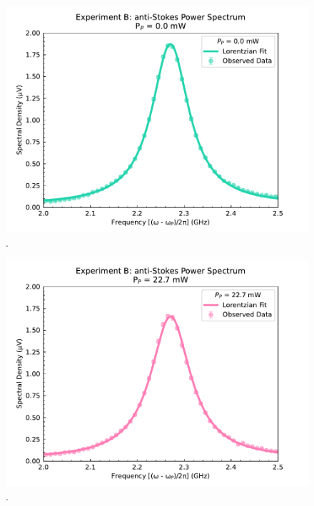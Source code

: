 \begin{figure}[t!]
  \centering
  \includegraphics[width=\textwidth]{figs/3-Cooling/P-P anti-Stokes Fit - 0mW.pdf}
  \caption{.}
  \label{fig:Cooling:P-P anti-Stokes Fit - 0mW}
\end{figure}

\begin{figure}[t!]
  \centering
  \includegraphics[width=\textwidth]{figs/3-Cooling/P-P anti-Stokes Fit - 55mW.pdf}
  \caption{.}
  \label{fig:Cooling:P-P anti-Stokes Fit - 55mW}
\end{figure}

